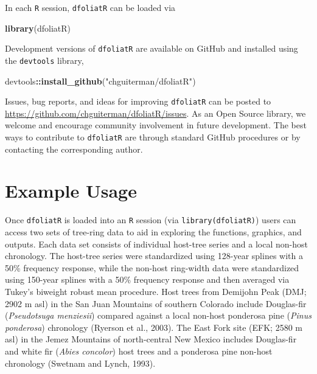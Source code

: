 \documentclass[review]{elsarticle} %
\newenvironment{Shaded}{\begin{snugshade}}{\end{snugshade}}
\newcommand{\KeywordTok}[1]{\textcolor[rgb]{0.13,0.29,0.53}{\textbf{#1}}}
\newcommand{\NormalTok}[1]{#1}
\newcommand{\OperatorTok}[1]{\textcolor[rgb]{0.81,0.36,0.00}{\textbf{#1}}}
\newcommand{\StringTok}[1]{\textcolor[rgb]{0.31,0.60,0.02}{#1}}
\begin{document}
In each \texttt{R} session, \texttt{dfoliatR} can be loaded via

\begin{Shaded}
\begin{Highlighting}[]
\KeywordTok{library}\NormalTok{(dfoliatR)}
\end{Highlighting}
\end{Shaded}

Development versions of \texttt{dfoliatR} are available on GitHub and installed using the \texttt{devtools} library,

\begin{Shaded}
\begin{Highlighting}[]
\NormalTok{devtools}\OperatorTok{::}\KeywordTok{install_github}\NormalTok{(}\StringTok{"chguiterman/dfoliatR"}\NormalTok{)}
\end{Highlighting}
\end{Shaded}

Issues, bug reports, and ideas for improving \texttt{dfoliatR} can be posted to \url{https://github.com/chguiterman/dfoliatR/issues}. As an Open Source library, we welcome and encourage community involvement in future development. The best ways to contribute to \texttt{dfoliatR} are through standard GitHub procedures or by contacting the corresponding author.

\hypertarget{example-usage}{%
\section{Example Usage}\label{example-usage}}

Once \texttt{dfoliatR} is loaded into an \texttt{R} session (via \texttt{library(dfoliatR)}) users can access two sets of tree-ring data to aid in exploring the functions, graphics, and outputs. Each data set consists of individual host-tree series and a local non-host chronology. The host-tree series were standardized using 128-year splines with a 50\% frequency response, while the non-host ring-width data were standardized using 150-year splines with a 50\% frequency response and then averaged via Tukey's biweight robust mean procedure. Host trees from Demijohn Peak (DMJ; 2902 m asl) in the San Juan Mountains of southern Colorado include Douglas-fir (\emph{Pseudotsuga menziesii}) compared against a local non-host ponderosa pine (\emph{Pinus ponderosa}) chronology (Ryerson et al., 2003). The East Fork site (EFK; 2580 m asl) in the Jemez Mountains of north-central New Mexico includes Douglas-fir and white fir (\emph{Abies concolor}) host trees and a ponderosa pine non-host chronology (Swetnam and Lynch, 1993).
\end{document}
